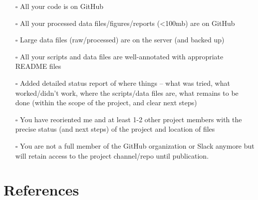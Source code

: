 \documentclass[
  letterpaper,
  DIV=11,
  numbers=noendperiod]{scrreprt}
\newlength{\cslhangindent}
\newlength{\cslentryspacingunit} %
\newenvironment{CSLReferences}[2] %
 {%
  \setlength{\parindent}{0pt}
  \ifodd #1
  \let\oldpar\par
  \def\par{\hangindent=\cslhangindent\oldpar}
  \fi
  \setlength{\parskip}{#2\cslentryspacingunit}
 }%
 {}
\begin{document}
\begin{itemize}
\item[$\square$]
  All your code is on GitHub
\item[$\square$]
  All your processed data files/figures/reports (\textless100mb) are on
  GitHub
\item[$\square$]
  Large data files (raw/processed) are on the server (and backed up)
\item[$\square$]
  All your scripts and data files are well-annotated with appropriate
  README files
\item[$\square$]
  Added detailed status report of where things -- what was tried, what
  worked/didn't work, where the scripts/data files are, what remains to
  be done (within the scope of the project, and clear next steps)
\item[$\square$]
  You have reoriented me and at least 1-2 other project members with the
  precise status (and next steps) of the project and location of files
\item[$\square$]
  You are not a full member of the GitHub organization or Slack anymore
  but will retain access to the project channel/repo until publication.
\end{itemize}


\hypertarget{references}{%
\chapter*{References}\label{references}}

\hypertarget{refs}{}
\begin{CSLReferences}{0}{0}
\end{CSLReferences}
\end{document}
